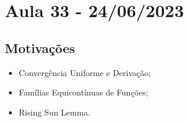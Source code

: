 \documentclass[../analysis_notes.tex]{subfiles}
\begin{document}
\section{Aula 33 - 24/06/2023}
\subsection{Motivações}
\begin{itemize}
	\item Convergência Uniforme e Derivação;
	\item Famílias Equicontínuas de Funções;
	\item Rising Sun Lemma.
\end{itemize}
\end{document}
